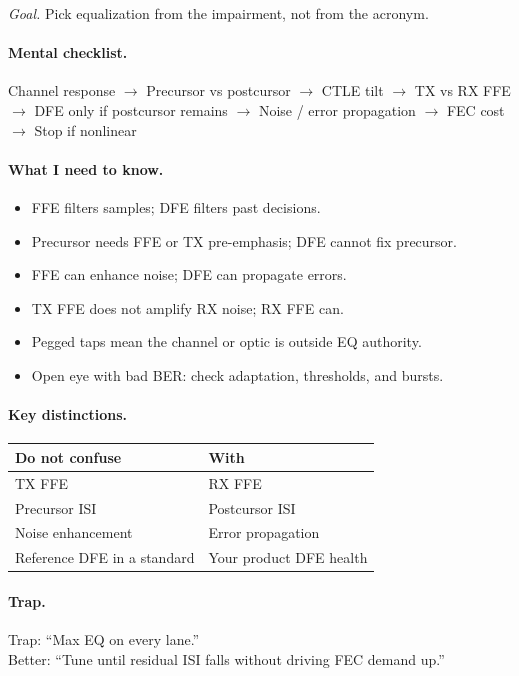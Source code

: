 \textit{Goal.} Pick equalization from the impairment, not from the acronym.

\paragraph{Mental checklist.}
Channel response $\rightarrow$ Precursor vs postcursor $\rightarrow$ CTLE tilt
$\rightarrow$ TX vs RX FFE $\rightarrow$ DFE only if postcursor remains
$\rightarrow$ Noise / error propagation $\rightarrow$ FEC cost $\rightarrow$
Stop if nonlinear

\paragraph{What I need to know.}
\begin{itemize}
\item FFE filters samples; DFE filters past decisions.
\item Precursor needs FFE or TX pre-emphasis; DFE cannot fix precursor.
\item FFE can enhance noise; DFE can propagate errors.
\item TX FFE does not amplify RX noise; RX FFE can.
\item Pegged taps mean the channel or optic is outside EQ authority.
\item Open eye with bad BER: check adaptation, thresholds, and bursts.
\end{itemize}

\paragraph{Key distinctions.}
\begin{center}
\footnotesize
\begin{tabular}{@{}ll@{}}
\toprule
Do not confuse & With \\
\midrule
TX FFE & RX FFE \\
Precursor ISI & Postcursor ISI \\
Noise enhancement & Error propagation \\
Reference DFE in a standard & Your product DFE health \\
\bottomrule
\end{tabular}
\end{center}

\paragraph{Trap.}
Trap: ``Max EQ on every lane.''\\
Better: ``Tune until residual ISI falls without driving FEC demand up.''


